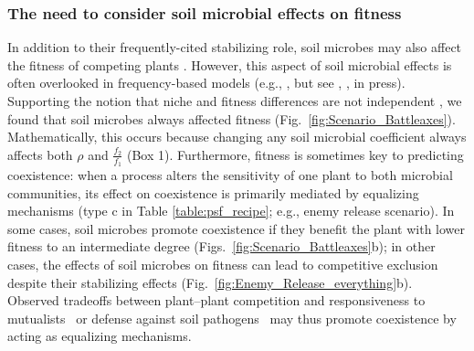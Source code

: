 \subsubsection*{The need to consider soil microbial effects on fitness}
In addition to their frequently-cited stabilizing role, soil microbes may also affect the fitness of competing plants \citep{Mordecai2011}.
However, this aspect of soil microbial effects is often overlooked in frequency-based models (e.g., \citealt{Bever1997}, but see \citealt{Eppinga2018}, \citeauthor{Kandlikar2019}, in press).
Supporting the notion that niche and fitness differences are not independent \citep{Letten2017, Barabas2018}, we found that soil microbes always affected fitness (Fig.~\ref{fig:Scenario_Battleaxes}). Mathematically, this occurs because changing any soil microbial coefficient always affects both $\rho$ and $\frac{f_{2}}{f_{1}}$ (Box 1).
Furthermore, fitness is sometimes key to predicting coexistence: when a process alters the sensitivity of one plant to both microbial communities, its effect on coexistence is primarily mediated by equalizing mechanisms (type c in Table \ref{table:psf_recipe}; e.g., enemy release scenario). 
In some cases, soil microbes promote coexistence if they benefit the plant with lower fitness to an intermediate degree (Figs.~\ref{fig:Scenario_Battleaxes}b); in other cases, the effects of soil microbes on fitness can lead to competitive exclusion despite their stabilizing effects (Fig.~\ref{fig:Enemy_Release_everything}b).
Observed tradeoffs between plant--plant competition and responsiveness to mutualists~\citep{Grman2012} or defense against soil pathogens~\citep{Rasmann2011} may thus promote coexistence by acting as equalizing mechanisms. 
\par


